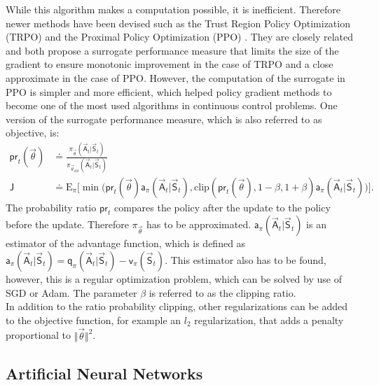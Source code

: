 While this algorithm makes a computation possible, it is inefficient. Therefore newer methods have been devised such as the Trust Region Policy Optimization (TRPO) \cite{schulman_trust_2015} and the Proximal Policy Optimization (PPO) \cite{schulman_proximal_2017}. They are closely related and both propose a surrogate performance measure that limits the size of the gradient to ensure monotonic improvement in the case of TRPO and a close approximate in the case of PPO. However, the computation of the surrogate in PPO is simpler and more efficient, which helped policy gradient methods to become one of the most used algorithms in continuous control problems. One version of the surrogate performance measure, which is also referred to as objective, is:
\begin{align}
\mathsf{pr}_t(\vec{\theta}) &\doteq \frac{\pi_{\vec{\theta}}(\vec{\mathsf{A}}_t \vert \vec{\mathsf{S}}_t)}{\pi_{\vec{\theta}_{old}} (\vec{\mathsf{A}}_t \vert \vec{\mathsf{S}}_t)} \\
\mathsf{J} &\doteq \mathrm{E}_\pi  \bigg[\min \Big(\mathsf{pr}_t(\vec{\theta}) \mathsf{a}_\pi(\vec{\mathsf{A}}_t \vert \vec{\mathsf{S}}_t), \mathrm{clip}(\mathsf{pr}_t(\vec{\theta}), 1- \beta, 1+\beta) \mathsf{a}_\pi(\vec{\mathsf{A}}_t \vert \vec{\mathsf{S}}_t) \Big) \bigg]. \label{eq:object_ppo}
\end{align}
The probability ratio $\mathsf{pr}_t$ compares the policy after the update to the policy before the update. Therefore $\pi_{\vec{\theta}}$ has to be approximated. $\mathsf{a}_\pi(\vec{\mathsf{A}}_t \vert \vec{\mathsf{S}}_t)$ is an estimator of the advantage function, which is defined as $\mathsf{a}_\pi(\vec{\mathsf{A}}_t \vert \vec{\mathsf{S}}_t) = \mathsf{q}_\pi(\vec{\mathsf{A}}_t \vert \vec{\mathsf{S}}_t) - \mathsf{v}_\pi(\vec{\mathsf{S}}_t)$. This estimator also has to be found, however, this is a regular optimization problem, which can be solved by use of SGD or Adam. The parameter $\beta$ is referred to as the clipping ratio. \cite{schulman_proximal_2017} \\
In addition to the ratio probability clipping, other regularizations can be added to the objective function, for example an $l_2$ regularization, that adds a penalty proportional to $\Vert\vec{\theta}\Vert^2$.
\subsection{Artificial Neural Networks}
